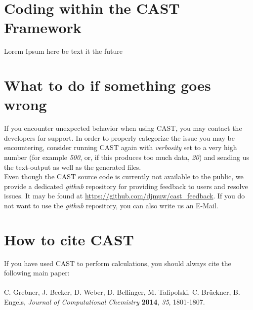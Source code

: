 \documentclass[10pt,a4paper]{article} %
\newif\ifdevmode %
\begin{document}
	\section{Coding within the CAST Framework}
	Lorem Ipsum here be text it the future \\
	\ifdevmode \colorbox{red}{Once CAST4 is up and running we should put some information on the code here.} \fi
	\fi


	\newpage
	\section{What to do if something goes wrong}
	If you encounter unexpected behavior when using \ac{CAST}, you may contact the developers for support. In order to properly categorize the issue you may be encountering, consider running \ac{CAST} again with \textit{verbosity} set to a very high number (for example \textit{500}, or, if this produces too much data, \textit{20}) and sending us the text-output as well as the generated files. \\

	Even though the \ac{CAST} source code is currently not available to the public, we provide a dedicated \textit{github} repository for providing feedback to users and resolve issues. It may be found at \url{https://github.com/djmuw/cast_feedback}. If you do not want to use the \textit{github} repository, you can also write us an E-Mail.

	\newpage
	\section{How to cite CAST}

	If you have used \ac{CAST} to perform calculations, you should always cite the following main paper:\\~\\
	C. Grebner, J. Becker, D. Weber, D. Bellinger, M. Tafipolski, C. Br\"uckner,
	B. Engels, \textit{Journal of Computational Chemistry} \textbf{2014}, \textit{35}, 1801-1807.~\\~\\
	
\end{document}
